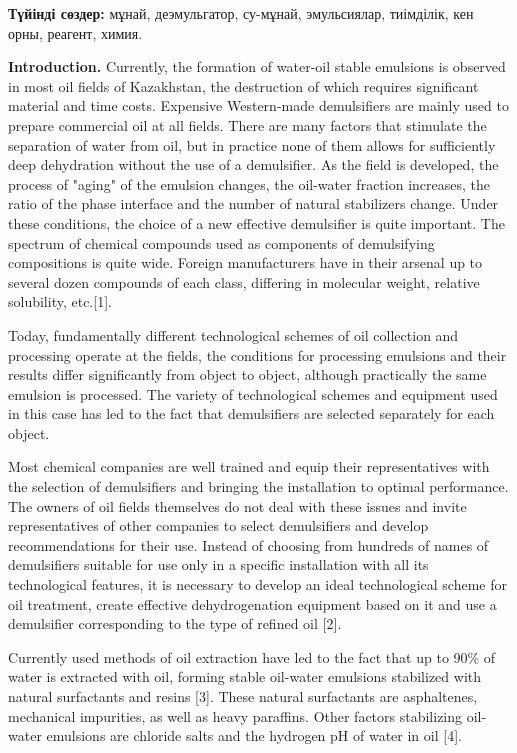 {\bfseries Түйінді сөздер:} мұнай, деэмульгатор, су-мұнай, эмульсиялар,
тиімділік, кен орны, реагент, химия.

\begin{multicols}{2}
{\bfseries Introduction.} Currently, the formation of water-oil stable
emulsions is observed in most oil fields of Kazakhstan, the destruction
of which requires significant material and time costs. Expensive
Western-made demulsifiers are mainly used to prepare commercial oil at
all fields. There are many factors that stimulate the separation of
water from oil, but in practice none of them allows for sufficiently
deep dehydration without the use of a demulsifier. As the field is
developed, the process of "aging" of the emulsion changes, the oil-water
fraction increases, the ratio of the phase interface and the number of
natural stabilizers change. Under these conditions, the choice of a new
effective demulsifier is quite important. The spectrum of chemical
compounds used as components of demulsifying compositions is quite wide.
Foreign manufacturers have in their arsenal up to several dozen
compounds of each class, differing in molecular weight, relative
solubility, etc.{[}1{]}.

Today, fundamentally different technological schemes of oil collection
and processing operate at the fields, the conditions for processing
emulsions and their results differ significantly from object to object,
although practically the same emulsion is processed. The variety of
technological schemes and equipment used in this case has led to the
fact that demulsifiers are selected separately for each object.

Most chemical companies are well trained and equip their representatives
with the selection of demulsifiers and bringing the installation to
optimal performance. The owners of oil fields themselves do not deal
with these issues and invite representatives of other companies to
select demulsifiers and develop recommendations for their use. Instead
of choosing from hundreds of names of demulsifiers suitable for use only
in a specific installation with all its technological features, it is
necessary to develop an ideal technological scheme for oil treatment,
create effective dehydrogenation equipment based on it and use a
demulsifier corresponding to the type of refined oil {[}2{]}.

Currently used methods of oil extraction have led to the fact that up to
90\% of water is extracted with oil, forming stable oil-water emulsions
stabilized with natural surfactants and resins {[}3{]}. These natural
surfactants are asphaltenes, mechanical impurities, as well as heavy
paraffins. Other factors stabilizing oil-water emulsions are chloride
salts and the hydrogen pH of water in oil {[}4{]}.


\end{multicols}
